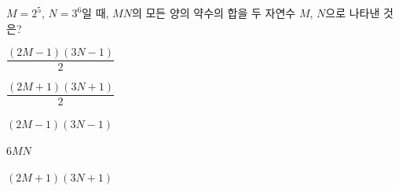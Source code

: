 $M=2^5$, $N=3^6$일 때, $MN$의 모든 양의 약수의 합을 두 자연수 $M$, $N$으로 나타낸 것은?
\begin{choicesii}{\rule[-3ex]{0pt}{8ex}$\dfrac{(2M-1)(3N-1)}{2}$}{\rule[-3ex]{0pt}{8ex}$\dfrac{(2M+1)(3N+1)}{2}$}{\rule[-3ex]{0pt}{8ex}$(2M-1)(3N-1)$}{\rule[-3ex]{0pt}{8ex}$6MN$}{\rule[-3ex]{0pt}{8ex}$(2M+1)(3N+1)$}\end{choicesii}
